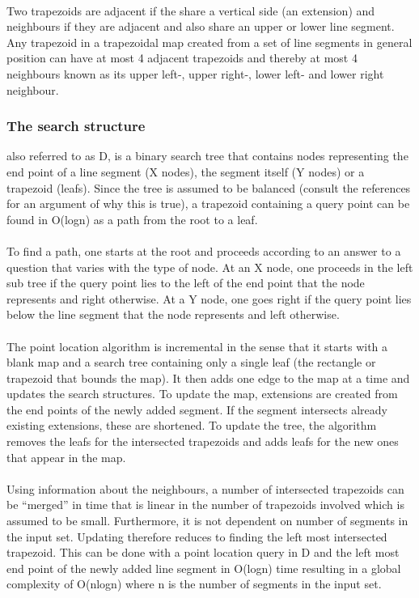 \paragraph{}
Two trapezoids are adjacent if the share a vertical side (an extension) and neighbours if they are adjacent and also share an upper or lower line segment. Any trapezoid in a trapezoidal map created from a set of line segments in general position can have at most 4 adjacent trapezoids and thereby at most 4 neighbours known as its upper left-, upper right-, lower left- and lower right neighbour.

\subsubsection{The search structure}
also referred to as D, is a binary search tree that contains nodes representing the end point of a line segment (X nodes), the segment itself (Y nodes) or a trapezoid (leafs). Since the tree is assumed to be balanced (consult the references for an argument of why this is true), a trapezoid containing a query point can be found in O(logn) as a path from the root to a leaf. 

\paragraph{}
To find a path, one starts at the root and proceeds according to an answer to a question that varies with the type of node. At an X node, one proceeds in the left sub tree if the query point lies to the left of the end point that the node represents and right otherwise. At a Y node, one goes right if the query point lies below the line segment that the node represents and left otherwise.

\paragraph{}
The point location algorithm is incremental in the sense that it starts with a blank map and a search tree containing only a single leaf (the rectangle or trapezoid that bounds the map). It then adds one edge to the map at a time and updates the search structures. To update the map, extensions are created from the end points of the newly added segment. If the segment intersects already existing extensions, these are shortened. To update the tree, the algorithm removes the leafs for the intersected trapezoids and adds leafs for the new ones that appear in the map.

\paragraph{}
Using information about the neighbours, a number of intersected trapezoids can be “merged” in time that is linear in the number of trapezoids involved which is assumed to be small. Furthermore, it is not dependent on number of segments in the input set. Updating therefore reduces to finding the left most intersected trapezoid. This can be done with a point location query in D and the left most end point of the newly added line segment in O(logn) time resulting in a global complexity of O(nlogn) where n is the number of segments in the input set.
